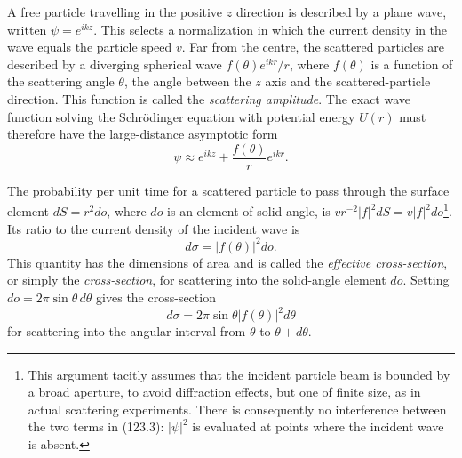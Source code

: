 A free particle travelling in the positive $z$ direction is described by a plane wave, written $\psi=e^{ikz}$. This selects a normalization in which the current density in the wave equals the particle speed $v$. Far from the centre, the scattered particles are described by a diverging spherical wave $f(\theta)e^{ikr}/r$, where $f(\theta)$ is a function of the scattering angle $\theta$, the angle between the $z$ axis and the scattered-particle direction. This function is called the \emph{scattering amplitude}. The exact wave function solving the Schrödinger equation with potential energy $U(r)$ must therefore have the large-distance asymptotic form
\begin{equation}
 \psi\approx e^{ikz}+\frac{f(\theta)}r e^{ikr}.
 \tag{123.3}
\end{equation}

The probability per unit time for a scattered particle to pass through the surface element $dS=r^2do$, where $do$ is an element of solid angle, is $vr^{-2}|f|^2dS=v|f|^2do$\footnote{This argument tacitly assumes that the incident particle beam is bounded by a broad aperture, to avoid diffraction effects, but one of finite size, as in actual scattering experiments. There is consequently no interference between the two terms in (123.3): $|\psi|^2$ is evaluated at points where the incident wave is absent.}. Its ratio to the current density of the incident wave is
\begin{equation}
 d\sigma=|f(\theta)|^2do.
 \tag{123.4}
\end{equation}
This quantity has the dimensions of area and is called the \emph{effective cross-section}, or simply the \emph{cross-section}, for scattering into the solid-angle element $do$. Setting $do=2\pi\sin\theta\,d\theta$ gives the cross-section
\begin{equation}
 d\sigma=2\pi\sin\theta|f(\theta)|^2d\theta
 \tag{123.5}
\end{equation}
for scattering into the angular interval from $\theta$ to $\theta+d\theta$.

